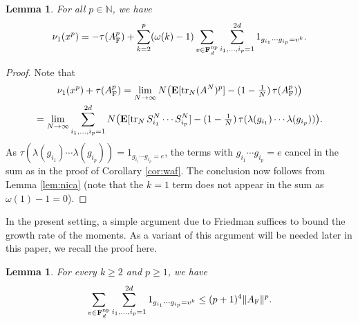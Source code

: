 \documentclass[10pt,reqno]{amsart}
\newtheorem{lem}[thm]{Lemma}
\theoremstyle{definition}
\theoremstyle{remark}
\numberwithin{equation}{section}
\numberwithin{figure}{section}
\numberwithin{table}{section}
\newcommand{\ntrN}{\mathop{\mathrm{tr}_N}}
\newcommand{\EE}{\mathbf{E}}
\begin{document}
\begin{lem}
\label{lem:friedmom}
For all $p\in\mathbb{N}$, we have
$$
	\nu_1(x^p) = -\tau(A_{\rm F}^p) +
	\sum_{k=2}^p
	(\omega(k)-1)
	\sum_{v\in\mathbf{F}_d^{\rm np}}
	\sum_{i_1,\ldots,i_p=1}^{2d}
	1_{g_{i_1}\cdots g_{i_p} = v^k}.
$$
\end{lem}

\begin{proof}
Note that
\begin{multline*}
	\nu_1(x^p) + \tau(A_{\rm F}^p) = 
	\lim_{N\to\infty}
	N\big(\EE[\ntrN (A^N)^p] - 
	(1-\tfrac{1}{N})\,\tau(A_{\rm F}^p)\big)
\\
	=
	\lim_{N\to\infty}
	\sum_{i_1,\ldots,i_p=1}^{2d}
	N\big(\EE[\ntrN S^N_{i_1}\cdots S^N_{i_p}] -
	(1-\tfrac{1}{N})\,
	\tau(\lambda(g_{i_1})\cdots \lambda(g_{i_p}))\big).
\end{multline*}
As $\tau(\lambda(g_{i_1})\cdots \lambda(g_{i_p})) =
1_{g_{i_1}\cdots g_{i_p}=e}$, the terms with $g_{i_1}\cdots g_{i_p}=e$
cancel in the sum as in the proof of Corollary \ref{cor:waf}. The
conclusion now follows from Lemma \ref{lem:nica} (note that the $k=1$ term
does not appear in the sum as $\omega(1)-1=0$).
\end{proof}

In the present setting, a simple argument due to Friedman \cite[Lemma 
2.4]{Fri03} suffices to bound the growth rate of the moments.
As a variant of this argument will be needed later in this paper, we 
recall the proof here.

\begin{lem}
\label{lem:friedsupp}
For every $k\ge 2$ and $p\ge 1$, we have
$$
	\sum_{v\in\mathbf{F}_d^{\rm np}}
        \sum_{i_1,\ldots,i_p=1}^{2d}   
        1_{g_{i_1}\cdots g_{i_p} = v^k}
	\le (p+1)^4 \|A_{\rm F}\|^p.
$$
\end{lem}
\end{document}
